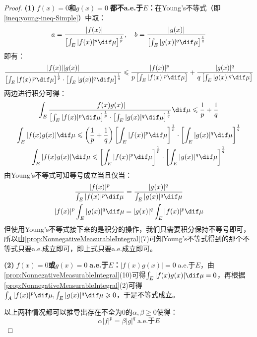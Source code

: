 \begin{proof}
	\textbf{(1)$\;f(x)=0$和$g(x)=0\;$都不a.e.于$E$：}在Young's不等式（即\cref{ineq:young-ineq-Simple}）中取：
	\begin{equation*}
		a=\frac{|f(x)|}{\left[\int_{E}^{}|f(x)|^p\dif\mu\right]^\frac{1}{p}},\quad
		b=\frac{|g(x)|}{\left[\int_{E}^{}|g(x)|^q\dif\mu\right]^\frac{1}{q}}
	\end{equation*}
	即有：
	\begin{equation*}
		\frac{|f(x)||g(x)|}{\left[\int_{E}^{}|f(x)|^p\dif\mu\right]^\frac{1}{p}\cdot\left[\int_{E}^{}|g(x)|^q\dif\mu\right]^\frac{1}{q}}
		\leqslant\frac{|f(x)|^p}{p\left[\int_{E}^{}|f(x)|^p\dif\mu\right]}+\frac{|g(x)|^q}{q\left[\int_{E}^{}|g(x)|^q\dif\mu\right]}
	\end{equation*}
	两边进行积分可得：
	\begin{gather*}
		\int_{E}\frac{|f(x)g(x)|}{\left[\int_{E}^{}|f(x)|^p\dif\mu\right]^\frac{1}{p}\cdot\left[\int_{E}^{}|g(x)|^q\dif\mu\right]^\frac{1}{q}}\dif\mu\leqslant\frac{1}{p}+\frac{1}{q} \\
		\int_{E}|f(x)g(x)|\dif\mu\leqslant\left(\frac{1}{p}+\frac{1}{q}\right)\left[\int_{E}^{}|f(x)|^p\dif\mu\right]^\frac{1}{p}\cdot\left[\int_{E}^{}|g(x)|^q\dif\mu\right]^\frac{1}{q} \\
		\int_{E}|f(x)g(x)|\dif\mu\leqslant\left[\int_{E}^{}|f(x)|^p\dif\mu\right]^\frac{1}{p}\cdot\left[\int_{E}^{}|g(x)|^q\dif\mu\right]^\frac{1}{q}
	\end{gather*}
	由Young's不等式可知等号成立当且仅当：
	\begin{gather*}
		\frac{|f(x)|^p}{\int_{E}^{}|f(x)|^p\dif\mu}=\frac{|g(x)|^q}{\int_{E}^{}|g(x)|^q\dif\mu} \\
		|f(x)|^p\int_{E}^{}|g(x)|^q\dif\mu=|g(x)|^q\int_{E}^{}|f(x)|^p\dif\mu
	\end{gather*}
	但使用Young's不等式接下来的是积分的操作，我们只需要积分保持不等号即可，所以由\cref{prop:NonnegativeMeasurableIntegral}(7)可知Young's不等式得到的那个不等式只要a.e.成立即可，即上式只要a.e.成立即可。\par
	\textbf{(2)$\;f(x)=0$或$g(x)=0\;$a.e.于$E$：}$|f(x)g(x)|=0\;$a.e.于$E$，由\cref{prop:NonnegativeMeasurableIntegral}(10)可得$\int_{E}|f(x)g(x)|\dif\mu=0$，再根据\cref{prop:NonnegativeMeasurableIntegral}(2)可得$\int_{A}|f(x)|^p\dif\mu,\int_{E}|g(x)|^q\dif\mu\geqslant0$，于是不等式成立。\par
	以上两种情况都可以推导出存在不全为$0$的$\alpha,\beta\geqslant0$使得：
	\begin{equation*}
		\alpha|f|^p=\beta|g|^q\;\text{a.e.于$E$}

\end{equation*}
\end{proof}
